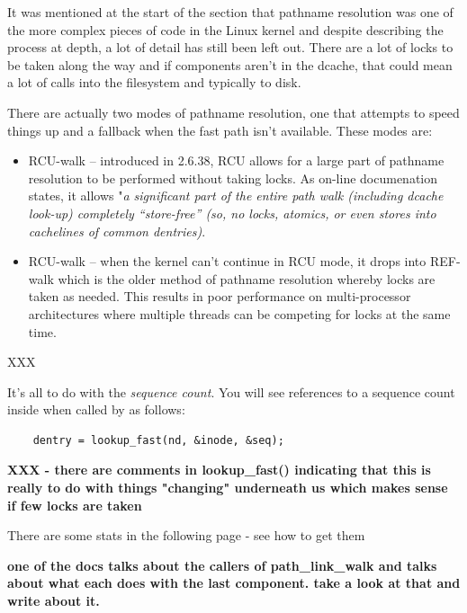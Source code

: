 It was mentioned at the start of the section that pathname resolution was one of the more complex pieces of code in the Linux kernel and despite describing the process at depth, a lot of detail has still been left out. There are a lot of locks to be taken along the way and if components aren't in the dcache, that could mean a lot of calls into the filesystem and typically to disk.

There are actually two modes of pathname resolution, one that attempts to speed things up and a fallback when the fast path isn't available. These modes are:

\begin{itemize}
	\item RCU-walk -- introduced in 2.6.38, RCU allows for a large part of pathname resolution to be performed without
		taking locks. As on-line documenation states, it allows "\textit{a significant part of the entire path walk (including 
		dcache look-up) completely “store-free” (so, no locks, atomics, or even stores into cachelines of common dentries)}.
	\item RCU-walk -- when the kernel can't continue in RCU  mode, it drops into REF-walk which is the older method
		of pathname resolution whereby locks are taken as needed. This results in poor performance on multi-processor
		architectures where multiple threads can be competing for locks at the same time.
\end{itemize}

\noindent
XXX

It's all to do with the \textit{sequence count}. You will see references to a sequence count inside  when called by  as follows:

\begin{lstlisting}
    dentry = lookup_fast(nd, &inode, &seq);
\end{lstlisting}

\noindent
\textbf{XXX - there are comments in lookup\_fast() indicating that this is really to do with things "changing" underneath us which makes sense if few locks are taken}

There are some stats in the following page - see how to get them


\textbf{one of the docs talks about the callers of path\_link\_walk and talks about what each does with the last component. take a look at that and write about it.}

